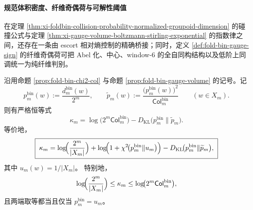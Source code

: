 \paragraph{规范体积密度、纤维奇偶荷与可解性阈值}
在定理 \ref{thm:xi-foldbin-collision-probability-normalized-groupoid-dimension} 的碰撞公式与定理 \ref{thm:xi-gauge-volume-boltzmann-stirling-exponential} 的指数律之间，还存在一条由 escort 相对熵控制的精确桥接；同时，定义 \ref{def:fold-bin-gauge-sign} 的纤维奇偶荷可把 Abel 化、中心、window-\(6\) 的全自同构结构以及低阶上同调统一为纯纤维判别。

\begin{theorem}\label{thm:xi-foldbin-gauge-escort-kl-decomposition}
沿用命题 \ref{prop:fold-bin-chi2-col} 与命题 \ref{prop:fold-bin-gauge-volume} 的记号。记
\[
p_m^{\mathrm{bin}}(w):=\frac{d_m^{\mathrm{bin}}(w)}{2^m},
\qquad
\widetilde p_m(w):=\frac{\bigl(p_m^{\mathrm{bin}}(w)\bigr)^2}{\mathsf{Col}^{\mathrm{bin}}_m}
\qquad (w\in X_m).
\]
则有严格恒等式
\[
\boxed{\;
\kappa_m
=
\log\!\bigl(2^m\mathsf{Col}^{\mathrm{bin}}_m\bigr)
-D_{\mathrm{KL}}\!\bigl(p_m^{\mathrm{bin}}\|\widetilde p_m\bigr).
\;}
\]
等价地，
\[
\boxed{\;
\kappa_m
=
\log\!\Bigl(\frac{2^m}{|X_m|}\Bigr)
+\log\!\Bigl(1+\chi^2\!\bigl(p_m^{\mathrm{bin}}\|u_m\bigr)\Bigr)
-D_{\mathrm{KL}}\!\bigl(p_m^{\mathrm{bin}}\|\widetilde p_m\bigr),
\;}
\]
其中 \(u_m(w)=1/|X_m|\)。
特别地，
\[
\log\!\Bigl(\frac{2^m}{|X_m|}\Bigr)
\le
\kappa_m
\le
\log\!\bigl(2^m\mathsf{Col}^{\mathrm{bin}}_m\bigr),
\]
且两端取等都当且仅当 \(p_m^{\mathrm{bin}}=u_m\)。
\end{theorem}
